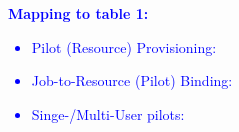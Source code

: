 \documentclass{sig-alternate}
\begin{document}
\textcolor{blue}
{
\textbf{Mapping to table 1:}
\begin{itemize}
\item Pilot (Resource) Provisioning:
\item Job-to-Resource (Pilot) Binding:
\item Singe-/Multi-User pilots:
\end{itemize}
}




\end{document}
